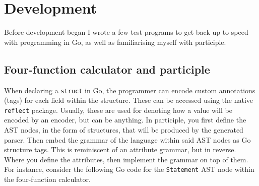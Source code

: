 \documentclass[]{full}
\theoremstyle{definition}
\begin{document}
\chapter{Development}
\label{chap:development}

Before development began I wrote a few test programs to get back up to speed with programming in Go, as well as familiarising myself with participle.

\section{Four-function calculator and participle}

When declaring a \verb|struct| in Go, the programmer can encode custom annotations (tags) for each field within the structure. These can be accessed using the native \verb|reflect| package. Usually, these are used for denoting how a value will be encoded by an encoder, but can be anything. In participle, you first define the AST nodes, in the form of structures, that will be produced by the generated parser. Then embed the grammar of the language within said AST nodes as Go structure tags. This is reminiscent of an attribute grammar, but in reverse. Where you define the attributes, then implement the grammar on top of them. For instance, consider the following Go code for the \verb|Statement| AST node within the four-function calculator.
\end{document}
